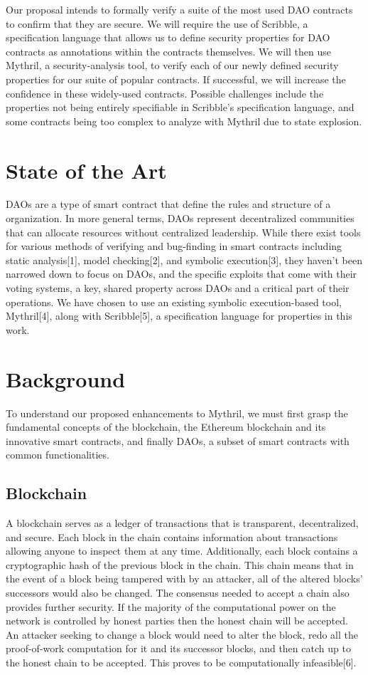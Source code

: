 \documentclass[conference]{IEEEtran}
\begin{document}
Our proposal intends to formally verify a suite of the most used DAO contracts to confirm that they are secure. We will require the use of Scribble, a specification language that allows us to define security properties for DAO contracts as annotations within the contracts themselves. We will then use Mythril, a security-analysis tool, to verify each of our newly defined security properties for our suite of popular contracts. If successful, we will increase the confidence in these widely-used contracts. Possible challenges include the properties not being entirely specifiable in Scribble's specification language, and some contracts being too complex to analyze with Mythril due to state explosion.

\section{State of the Art}

DAOs are a type of smart contract that define the rules and structure of a organization. In more general terms, DAOs represent decentralized communities that can allocate resources without centralized leadership. While there exist tools for various methods of verifying and bug-finding in smart contracts including static analysis[1], model checking[2], and symbolic execution[3], they haven’t been narrowed down to focus on DAOs, and the specific exploits that come with their voting systems, a key, shared property across DAOs and a critical part of their operations. We have chosen to use an existing symbolic execution-based tool, Mythril[4], along with Scribble[5], a specification language for properties in this work. 


\section{Background}
To understand our proposed enhancements to Mythril, we must first grasp the fundamental concepts of the blockchain, the Ethereum blockchain and its innovative smart contracts, and finally DAOs, a subset of smart contracts with common functionalities.

\subsection{Blockchain}
A blockchain serves as a ledger of transactions that is transparent, decentralized, and secure. Each block in the chain contains information about transactions allowing anyone to inspect them at any time. Additionally, each block contains a cryptographic hash of the previous block in the chain. This chain means that in the event of a block being tampered with by an attacker, all of the altered blocks' successors would also be changed. The consensus needed to accept a chain also provides further security. If the majority of the computational power on the network is controlled by honest parties then the honest chain will be accepted. An attacker seeking to change a block would need to alter the block, redo all the proof-of-work computation for it and its successor blocks, and then catch up to the honest chain to be accepted. This proves to be computationally infeasible[6].
\end{document}
